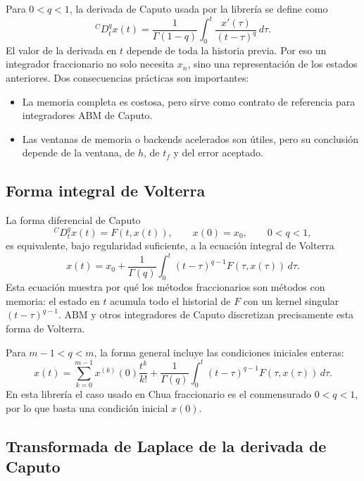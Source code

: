 \documentclass[11pt]{article}
\begin{document}
Para \(0<q<1\), la derivada de Caputo usada por la librería se define
como~\cite{Caputo1967,Podlubny1999}
\[
{}^{C}D_t^q x(t)=
\frac{1}{\Gamma(1-q)}
\int_0^t \frac{x'(\tau)}{{\left(t-\tau\right)}^q}\,d\tau .
\]
El valor de la derivada en \(t\) depende de toda la historia previa. Por eso
un integrador fraccionario no solo necesita \(x_n\), sino una representación
de los estados anteriores. Dos consecuencias prácticas son importantes:

\begin{itemize}
  \item La memoria completa es costosa, pero sirve como contrato de referencia
  para integradores ABM de Caputo.
  \item Las ventanas de memoria o backends acelerados son útiles, pero su
  conclusión depende de la ventana, de \(h\), de \(t_f\) y del error aceptado.
\end{itemize}

\subsection{Forma integral de Volterra}

La forma diferencial de Caputo
\[
{}^{C}D_t^q x(t)=F(t,x(t)),\qquad x(0)=x_0,\qquad 0<q<1,
\]
es equivalente, bajo regularidad suficiente, a la ecuación integral de
Volterra
\begin{equation}
x(t)=x_0+
\frac{1}{\Gamma(q)}
\int_0^t {\left(t-\tau\right)}^{q-1}F(\tau,x(\tau))\,d\tau .
\label{eq:caputo_volterra}
\end{equation}
Esta ecuación muestra por qué los métodos fraccionarios son métodos con
memoria: el estado en \(t\) acumula todo el historial de \(F\) con un kernel
singular \({\left(t-\tau\right)}^{q-1}\). ABM y otros integradores de Caputo discretizan
precisamente esta forma de Volterra.

Para \(m-1<q<m\), la forma general incluye las condiciones iniciales enteras:
\[
x(t)=
\sum_{k=0}^{m-1}x^{(k)}(0)\frac{t^k}{k!}
+\frac{1}{\Gamma(q)}
\int_0^t {\left(t-\tau\right)}^{q-1}F(\tau,x(\tau))\,d\tau .
\]
En esta librería el caso usado en Chua fraccionario es el conmensurado
\(0<q<1\), por lo que basta una condición inicial \(x(0)\).

\subsection{Transformada de Laplace de la derivada de Caputo}
\end{document}
